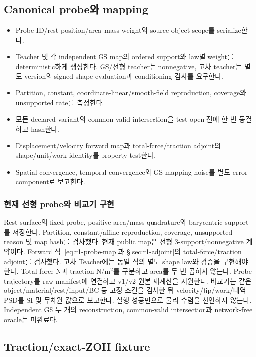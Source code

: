 \documentclass[10pt]{article}
\begin{document}
\subsection{Canonical probe와 mapping}

\begin{itemize}
  \item[$\square$] Probe ID/rest position/area--mass weight와 source-object scope를 serialize한다.
  \item[$\square$] Teacher 및 각 independent GS map의 ordered support와 law별 weight를 deterministic하게 생성한다.
  GS/선형 teacher는 nonnegative, 고차 teacher는 별도 version의 signed shape evaluation과 conditioning 검사를 요구한다.
  \item[$\square$] Partition, constant, coordinate-linear/smooth-field reproduction, coverage와 unsupported rate를 측정한다.
  \item[$\square$] 모든 declared variant의 common-valid intersection을 test open 전에 한 번 동결하고 hash한다.
  \item[$\square$] Displacement/velocity forward map과 total-force/traction adjoint의 shape/unit/work identity를 property test한다.
  \item[$\square$] Spatial convergence, temporal convergence와 GS mapping noise를 별도 error component로 보고한다.
\end{itemize}

\subsubsection{현재 선형 probe와 비교기 구현}

Rest surface의 fixed probe, positive area/mass quadrature와 barycentric support를 저장한다.
Partition, constant/affine reproduction, coverage, unsupported reason 및 map hash를 검사했다.
현재 public map은 선형 3-support/nonnegative 계약이다.
Forward 식~\eqref{eq:r1-probe-map}과 \S\ref{sec:r1-adjoint}의 total-force/traction adjoint를 검사했다.
고차 Teacher에는 동일 식의 별도 shape law와 검증을 구현해야 한다.
Total force N과 traction N/m\(^2\)를 구분하고 area를 두 번 곱하지 않는다.
Probe trajectory를 raw manifest에 연결하고 v1/v2 원본 재계산을 지원한다.
비교기는 같은 object/material/rest/input/BC 등 고정 조건을 검사한 뒤 velocity/tip/work/대역 PSD를
SI 및 무차원 값으로 보고한다. 실행 성공만으로 물리 수렴을 선언하지 않는다.
Independent GS 두 개의 reconstruction, common-valid intersection과 network-free oracle는 미완료다.

\subsection{Traction/exact-ZOH fixture}
\end{document}
